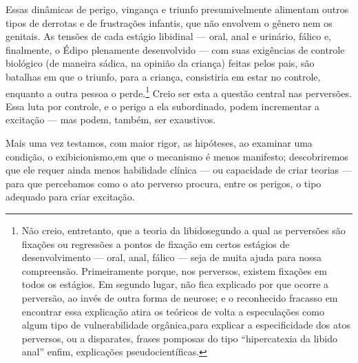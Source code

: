 Essas dinâmicas de perigo, vingança e triunfo presumivelmente
alimentam outros tipos de derrotas e de frustrações infantis, que não
envolvem o gênero nem os genitais. As tensões de cada estágio libidinal\idxlibid{}
--- oral, anal e urinário, fálico e, finalmente, o Édipo plenamente
desenvolvido --- com suas exigências de controle biológico (de maneira
sádica, na opinião da criança) feitas pelos pais, são batalhas em que o
triunfo, para a criança, consistiria em estar no controle, enquanto a
outra pessoa o perde.\footnote{ Não creio, entretanto, que a teoria da
libido\idxlibid[|nn] segundo a qual as perversões são fixações ou regressões a pontos
de fixação em certos estágios de desenvolvimento --- oral, anal,
fálico --- seja de muita ajuda para nossa compreensão. Primeiramente
porque, nos perversos, existem fixações em todos os estágios. Em
segundo lugar, não fica explicado por que ocorre a perversão, ao invés
de outra forma de neurose; e o reconhecido fracasso em encontrar essa
explicação atira os teóricos de volta a especulações como algum tipo
de vulnerabilidade orgânica,\idxvulne[|nn] para explicar a especificidade dos atos
perversos, ou a disparates, frases pomposas do tipo
``hipercatexia da libido anal'' enfim,
explicações pseudocientíficas.} Creio ser esta a questão central nas
perversões. Essa luta por controle, e o perigo a ela subordinado,
podem incrementar a excitação --- mas podem, também, ser exaustivos.

Mais uma vez testamos, com maior rigor, as hipóteses, ao examinar
uma condição, o exibicionismo,\idxexibi[|(] em que o mecanismo é menos manifesto;
descobriremos que ele requer ainda menos habilidade clínica --- ou
capacidade de criar teorias --- para que percebamos como o ato
perverso procura, entre os perigos, o tipo adequado para criar
excitação.

